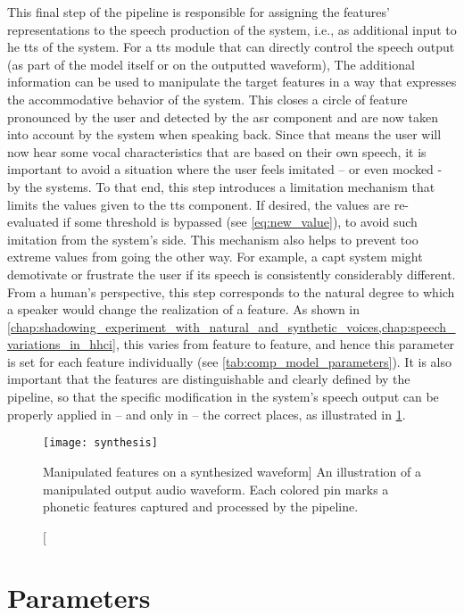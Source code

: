 This final step of the pipeline is responsible for assigning the features' representations to the speech production of the system, i.e., as additional input to he \ac{tts} of the system.
For a \ac{tts} module that can directly control the speech output (as part of the model itself or on the outputted waveform),
The additional information can be used to manipulate the target features in a way that expresses the accommodative behavior of the system.
This closes a circle of feature pronounced by the user and detected by the \ac{asr} component and are now taken into account by the system when speaking back.
Since that means the user will now hear some vocal characteristics that are based on their own speech, it is important to avoid a situation where the user feels imitated -- or even mocked - by the systems.
To that end, this step introduces a limitation mechanism that limits the values given to the \ac{tts} component.
If desired, the values are re-evaluated if some threshold is bypassed (see \cref{eq:new_value}), to avoid such imitation from the system's side.
This mechanism also helps to prevent too extreme values from going the other way.
For example, a \ac{capt} system might demotivate or frustrate the user if its speech is consistently considerably different.
From a human's perspective, this step corresponds to the natural degree to which a speaker would change the realization of a feature.
As shown in \cref{chap:shadowing_experiment_with_natural_and_synthetic_voices,chap:speech_variations_in_hhci}, this varies from feature to feature, and hence this parameter is set for each feature individually (see \cref{tab:comp_model_parameters}).
It is also important that the features are distinguishable and clearly defined by the pipeline, so that the specific modification in the system's speech output can be properly applied in -- and only in -- the correct places, as illustrated in \cref{fig:adapted_synthesis_output}.
%
\begin{figure}
	\centering
	\texttt{[image: synthesis]}
	\caption
	[Manipulated features on a synthesized waveform]
	{An illustration of a manipulated output audio waveform.
		Each colored pin marks a phonetic features captured and processed by the pipeline.}
	\label{fig:adapted_synthesis_output}
\end{figure}

\section{Parameters}
\label{sec:parameters}

